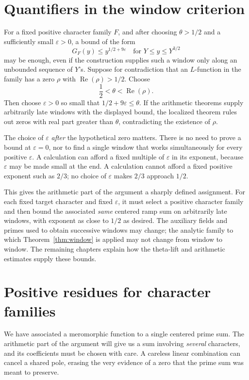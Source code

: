 \documentclass[11pt,openany,oneside]{scrbook}
\theoremstyle{definition}
\theoremstyle{remark}
\newcommand{\Rea}{\operatorname{Re}}
\newcommand{\eps}{\varepsilon}
\begin{document}
\section{Quantifiers in the window criterion}

For a fixed positive character family $F$, and after choosing $\theta>1/2$ and a sufficiently small $\eps>0$, a bound of the form
\[
G_F(y)\le y^{1/2+9\eps}
\quad\text{for }Y\le y\le Y^{3/2}
\]
may be enough, even if the construction supplies such a window only along an unbounded sequence of $Y$'s. Suppose for contradiction that an $L$-function in the family has a zero $\rho$ with $\Rea(\rho)>1/2$. Choose
\[
\frac12<\theta<\Rea(\rho).
\]
Then choose $\eps>0$ so small that $1/2+9\eps\le\theta$. If the arithmetic theorems supply arbitrarily late windows with the displayed bound, the localized theorem rules out zeros with real part greater than $\theta$, contradicting the existence of $\rho$.

The choice of $\eps$ \emph{after} the hypothetical zero matters. There is no need to prove a bound at $\eps=0$, nor to find a single window that works simultaneously for every positive $\eps$. A calculation can afford a fixed multiple of $\eps$ in its exponent, because $\eps$ may be made small at the end. A calculation cannot afford a fixed positive exponent such as $2/3$; no choice of $\eps$ makes $2/3$ approach $1/2$.

This gives the arithmetic part of the argument a sharply defined assignment. For each fixed target character and fixed $\eps$, it must select a positive character family and then bound the associated \emph{same} centered ramp sum on arbitrarily late windows, with exponent as close to $1/2$ as desired. The auxiliary fields and primes used to obtain successive windows may change; the analytic family to which Theorem~\ref{thm:window} is applied may not change from window to window. The remaining chapters explain how the theta-lift and arithmetic estimates supply these bounds.

\section{Positive residues for character families}\label{sec:positive-residues}

We have associated a meromorphic function to a single centered prime sum.  The arithmetic part of the argument will give us a sum involving \emph{several} characters, and its coefficients must be chosen with care.  A careless linear combination can cancel a shared pole, erasing the very evidence of a zero that the prime sum was meant to preserve.
\end{document}
